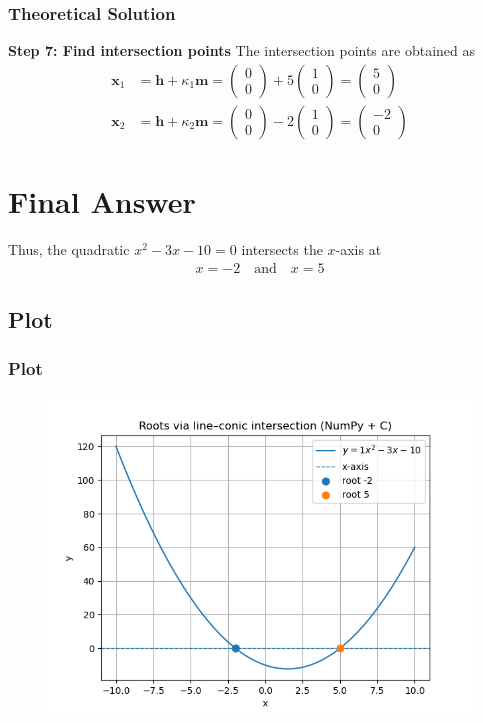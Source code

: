 \documentclass{beamer}
\theoremstyle{remark}
\newcommand{\myvec}[1]{\ensuremath{\begin{pmatrix}#1\end{pmatrix}}}
\let\vec\mathbf
\numberwithin{equation}{section}
\begin{document}
\begin{frame}
\frametitle{Theoretical Solution}
\noindent\textbf{Step 7: Find intersection points}  
The intersection points are obtained as
\begin{align}
\vec{x}_1 &= \vec{h} + \kappa_1 \vec{m} 
= \myvec{0 \\ 0} + 5\myvec{1 \\ 0} = \myvec{5 \\ 0} \\[1ex]
\vec{x}_2 &= \vec{h} + \kappa_2 \vec{m} 
= \myvec{0 \\ 0} - 2\myvec{1 \\ 0} = \myvec{-2 \\ 0}
\end{align}

\section*{Final Answer}

Thus, the quadratic $x^2 - 3x - 10 = 0$ intersects the $x$-axis at
\begin{align}
\boxed{x = -2 \quad \text{and} \quad x = 5}
\end{align}


\end{frame}


\subsection{Plot}
\begin{frame}
    \frametitle{Plot}
\begin{figure}[H]
   \centering
   \includegraphics[width=0.8\columnwidth]{figs/parabola.png}
   \caption{}
   \label{}
   \end{figure}
\end{frame}
\end{document}
